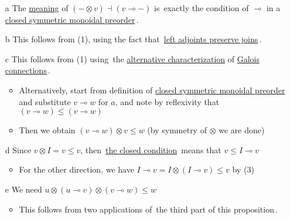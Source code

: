 \begin{itemize}
    \item[a] The \hyperref[D1.95]{meaning} of $(- \otimes v) \dashv (v \multimap -)$ is \,exactly the condition of $\multimap$ in a \hyperref[D2.79]{closed symmetric monoidal preorder}\,.
    \item[b] This follows from (1), using the fact that \,\hyperref[P1.111]{left adjoints preserve joins}\,.
    \item[c] This follows from (1) using \,the \hyperref[P1.107]{alternative characterization} of \hyperref[D1.95]{Galois connections}\,.
          \begin{itemize}
            \item Alternatively, start from definition of \hyperref[D2.79]{closed symmetric monoidal preorder} and substitute $v \multimap w$ for $a$, and note by reflexivity that  $(v \multimap w) \leq (v \multimap w)$
            \item Then we obtain $(v \multimap w) \otimes v \leq w$ (by symmetry of $\otimes$ we are done)
          \end{itemize}
    \item[d] Since $v \otimes I = v \leq v$, then \,\hyperref[D2.79]{the closed condition}\, means that $v \leq I \multimap v$
          \begin{itemize}
            \item For the other direction, we have $I \multimap v = I \otimes (I \multimap v) \leq v$ by (3)
          \end{itemize}
    \item[e] We need $u \otimes (u \multimap v) \otimes (v \multimap w) \leq w$
          \begin{itemize}
            \item This follows from two applications of \,the third part of this proposition\,.
          \end{itemize}
  \end{itemize}